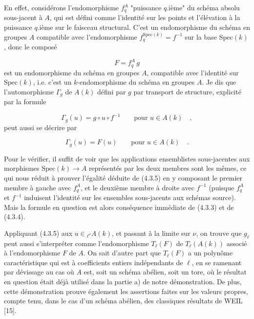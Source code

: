 En effet, considérons l'endomorphisme $f_q^A$ "puissance $q$.ième" du schéma absolu sous-jacent à $A$, qui est défini comme l'identité sur les points et l'élévation à la puissance $q$.ième sur le faisceau structural. C'est un endomorphisme du schéma en groupes $A$ compatible avec l'endomorphisme $f_q^{\mathrm{Spec}(k)} = f^{-1}$ sur la base $\mathrm{Spec}(k)$, donc le composé

\begin{equation}\tag{4.3.3}
F = f_q^A\, g
\end{equation}
est un endomorphisme du schéma en groupes $A$, compatible avec l'identité sur $\mathrm{Spec}(k)$, i.e. c'est un $k$-endomorphisme du schéma en groupes $A$. Je dis que l'automorphisme $\Gamma_g$ de $A(k)$ défini par $g$ par transport de structure, explicité par la formule

\begin{equation}\tag{4.3.4}
\Gamma_g(u) = g \circ u \circ f^{-1} \qquad \mbox{pour } u \in A(k) \quad ,
\end{equation}
peut aussi se décrire par

\begin{equation}\tag{4.3.5}
\Gamma_g(u) = F(u) \qquad \mbox{pour } u \in A(k) \quad .
\end{equation}


Pour le vérifier, il suffit de voir que les applications ensemblistes sous-jacentes aux morphismes $\mathrm{Spec}(k) \longrightarrow A$ représentés par les deux membres sont les mêmes, ce qui nous réduit à prouver l'égalité déduite de (4.3.5) en y composant le premier membre à gauche avec $f_q^A$, et le deuxième membre à droite avec $f^{-1}$ (puisque $f_q^A$ et $f^{-1}$ induisent l'identité sur les ensembles sous-jacents aux schémas source). Mais la formule en question est alors conséquence immédiate de (4.3.3) et de (4.3.4).

Appliquant (4.3.5) aux $u \in {}_{\ell^\nu}A(k)$, et passant à la limite sur $\nu$, on trouve que $g_\ell$ peut aussi s'interpréter comme l'endomorphisme $T_\ell(F)$ de $T_\ell(A(k))$ associé à l'endomorphisme $F$ de $A$. On sait d'autre part que $T_\ell(F)$ a un polynôme caractéristique qui est à coefficients entiers indépendants de $\ell$, en se ramenant par dévissage au cas où $A$ est, soit un schéma abélien, soit un tore, où le résultat en question était déjà utilisé dans la partie a) de notre démonstration. De plus, cette démonstration prouve également les assertions faites sur les valeurs propres, compte tenu, dans le cas d'un schéma abélien, des classiques résultats de WEIL [15].

